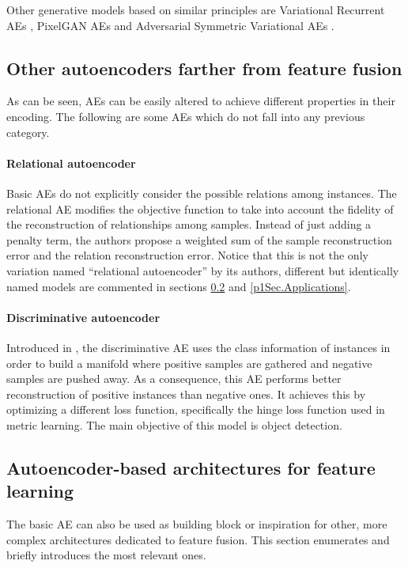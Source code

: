 Other generative models based on similar principles are Variational Recurrent AEs , PixelGAN AEs  and Adversarial Symmetric Variational AEs .


\subsection{Other autoencoders farther from feature fusion}\label{p1Sec.OtherAEs}

As can be seen, AEs can be easily altered to achieve different properties in their encoding. The following are some AEs which do not fall into any previous category.

\paragraph{Relational autoencoder}
Basic AEs do not explicitly consider the possible relations among instances. The relational AE  modifies the objective function to take into account the fidelity of the reconstruction of relationships among samples. Instead of just adding a penalty term, the authors propose a weighted sum of the sample reconstruction error and the relation reconstruction error. Notice that this is not the only variation named ``relational autoencoder'' by its authors, different but identically named models are commented in sections \ref{p1Sec.AEbased} and \ref{p1Sec.Applications}.

\paragraph{Discriminative autoencoder} Introduced in , the discriminative AE uses the class information of instances in order to build a manifold where positive samples are gathered and negative samples are pushed away. As a consequence, this AE performs better reconstruction of positive instances than negative ones. It achieves this by optimizing a different loss function, specifically the hinge loss function used in metric learning. The main objective of this model is object detection.

\subsection{Autoencoder-based architectures for feature learning} \label{p1Sec.AEbased}

The basic AE can also be used as building block or inspiration for other, more complex architectures dedicated to feature fusion. This section enumerates and briefly introduces the most relevant ones.

